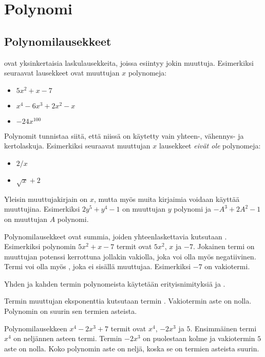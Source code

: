 \chapter{Polynomi}

\section{Polynomilausekkeet}

 ovat yksinkertaisia laskulausekkeita, joissa esiintyy jokin muuttuja.
Esimerkiksi seuraavat lausekkeet ovat muuttujan $x$ polynomeja:
\begin{itemize}
\item $5x^2+x-7$
\item $x^4-6x^3+2x^2-x$
\item $-24x^{100}$
\end{itemize}
Polynomit tunnistaa siitä, että niissä on käytetty vain yhteen-, vähennys- ja kertolaskuja.
Esimerkiksi seuraavat muuttujan $x$ lausekkeet \emph{eivät ole} polynomeja:
\begin{itemize}
\item $2/x$
\item $\sqrt{x}+2$
\end{itemize}
Yleisin muuttujakirjain on $x$, mutta myös muita kirjaimia voidaan käyttää
muuttujina. Esimerkiksi $2y^5+y^4-1$ on muuttujan $y$ polynomi ja
$-A^3+2A^2-1$ on muuttujan $A$ polynomi.

Polynomilausekkeet ovat summia, joiden yhteenlaskettavia kutsutaan .
Esimerkiksi polynomin $5x^2+x-7$ termit ovat $5x^2$, $x$ ja $-7$. Jokainen termi on muuttujan potenssi kerrottuna jollakin vakiolla, joka voi olla myös  negatiivinen. Termi voi olla myös , joka ei sisällä muuttujaa. Esimerkiksi $-7$ on vakiotermi.

Yhden ja kahden termin polynomeista käytetään erityisnimityksiä  ja .

Termin muuttujan eksponenttia kutsutaan termin .
Vakiotermin aste on nolla.
Polynomin  on suurin sen termien asteista.

\begin{esimerkki}
Polynomilausekkeen $x^4-2x^3+7$ termit ovat $x^4$, $-2x^3$ ja $5$.
Ensimmäinen termi $x^4$ on neljännen asteen termi. Termin $-2x^3$ on puolestaan kolme ja vakiotermin $5$ aste on nolla.
Koko polynomin aste on neljä, koska se on termien asteista suurin.
\end{esimerkki}

